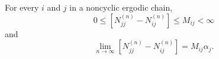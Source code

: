 For every $i$ and $j$ in a noncyclic ergodic chain,
$$0 \leq [N_{jj}^{(n)} - N_{ij}^{(n)}] \leq M_{ij} < \infty$$
and
$$\lim_{n \to \infty} [N_{jj}^{(n)} - N_{ij}^{(n)}] = M_{ij}\alpha_j.$$
